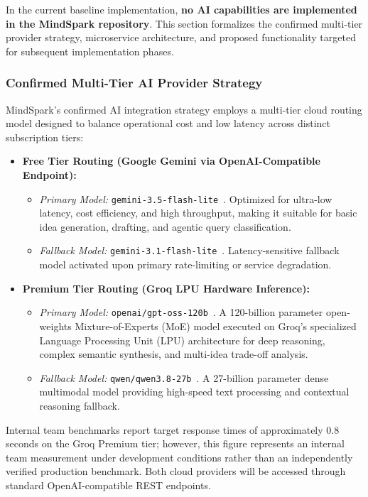 In the current baseline implementation, \textbf{no AI capabilities are implemented in the MindSpark repository}. This section formalizes the confirmed multi-tier provider strategy, microservice architecture, and proposed functionality targeted for subsequent implementation phases.

\subsubsection{Confirmed Multi-Tier AI Provider Strategy}
MindSpark's confirmed AI integration strategy employs a multi-tier cloud routing model designed to balance operational cost and low latency across distinct subscription tiers:
\begin{itemize}
    \item \textbf{Free Tier Routing (Google Gemini via OpenAI-Compatible Endpoint):}
    \begin{itemize}
        \item \textit{Primary Model:} \texttt{gemini-3.5-flash-lite}~\cite{google_gemini_models}. Optimized for ultra-low latency, cost efficiency, and high throughput, making it suitable for basic idea generation, drafting, and agentic query classification.
        \item \textit{Fallback Model:} \texttt{gemini-3.1-flash-lite}~\cite{google_gemini_models}. Latency-sensitive fallback model activated upon primary rate-limiting or service degradation.
    \end{itemize}
    \item \textbf{Premium Tier Routing (Groq LPU Hardware Inference):}
    \begin{itemize}
        \item \textit{Primary Model:} \texttt{openai/gpt-oss-120b}~\cite{groq_models_docs}. A 120-billion parameter open-weights Mixture-of-Experts (MoE) model executed on Groq's specialized Language Processing Unit (LPU) architecture for deep reasoning, complex semantic synthesis, and multi-idea trade-off analysis.
        \item \textit{Fallback Model:} \texttt{qwen/qwen3.8-27b}~\cite{groq_models_docs}. A 27-billion parameter dense multimodal model providing high-speed text processing and contextual reasoning fallback.
    \end{itemize}
\end{itemize}
Internal team benchmarks report target response times of approximately 0.8 seconds on the Groq Premium tier; however, this figure represents an internal team measurement under development conditions rather than an independently verified production benchmark. Both cloud providers will be accessed through standard OpenAI-compatible REST endpoints.

